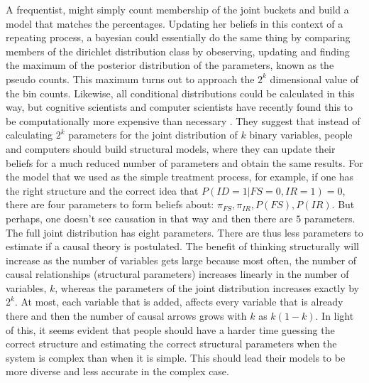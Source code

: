 A frequentist, might simply count membership of the joint buckets and build a model that matches the percentages. Updating her beliefs in this context of a repeating process, a bayesian could essentially do the same thing by comparing members of the dirichlet distribution class by obeserving, updating and finding the maximum of the posterior distribution of the parameters, known as the pseudo counts. This maximum turns out to approach the $2^k$ dimensional value of the bin counts. Likewise, all conditional distributions could be calculated in this way, but cognitive scientists and computer scientists have recently found this to be computationally more expensive than necessary \citep{Griffith08, Koller03}.  They suggest that instead of calculating $2^k$ parameters for the joint distribution of $k$ binary variables, people and computers should build structural models, where they can update their beliefs for a much reduced number of parameters and obtain the same results. For the model that we used as the simple treatment process, for example, if one has the right structure and the correct idea that $P(ID=1|FS=0, IR=1)=0$, there are four parameters to form beliefs about: $\pi_{FS}, \pi_{IR}, P(FS), P(IR)$. But perhaps, one doesn't see causation in that way and then there are $5$ parameters.  The full joint distribution has eight parameters.  There are thus less parameters to estimate if a causal theory is postulated. The benefit of thinking structurally will increase as the number of variables gets large because most often, the number of causal relationships (structural parameters) increases linearly in the number of variables, $k$, whereas the parameters of the joint distribution increases exactly by $2^k$.  At most, each variable that is added, affects every variable that is already there and then the number of causal arrows grows with $k$ as $k(1-k)$. In light of this, it seems evident that people should have a harder time guessing the correct structure and estimating the correct structural parameters when the system is complex than when it is simple. This should lead their models to be more diverse and less accurate in the complex case. 

